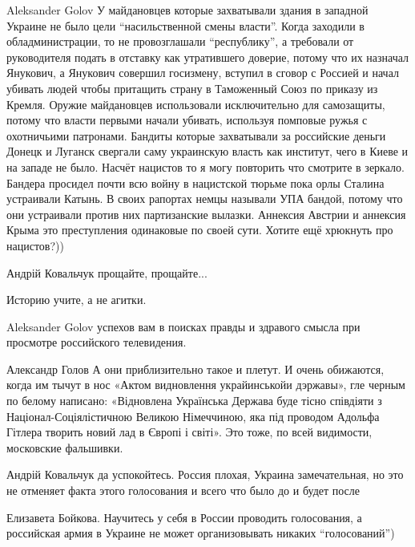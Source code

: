 \begin{itemize}

Aleksander Golov У майдановцев которые захватывали здания в западной Украине не
было цели \enquote{насильственной смены власти}. Когда заходили в обладминистрации, то
не провозглашали \enquote{республику}, а требовали от руководителя подать в отставку
как утратившего доверие, потому что их назначал Янукович, а Янукович совершил
госизмену, вступил в сговор с Россией и начал убивать людей чтобы притащить
страну в Таможенный Союз по приказу из Кремля. Оружие майдановцев использовали
исключительно для самозащиты, потому что власти первыми начали убивать,
используя помповые ружья с охотничьими патронами. Бандиты которые захватывали
за российские деньги Донецк и Луганск свергали саму украинскую власть как
институт, чего в Киеве и на западе не было. Насчёт нацистов то я могу повторить
что смотрите в зеркало. Бандера просидел почти всю войну в нацистской тюрьме
пока орлы Сталина устраивали Катынь. В своих рапортах немцы называли УПА
бандой, потому что они устраивали против них партизанские вылазки. Аннексия
Австрии и аннексия Крыма это преступления одинаковые по своей сути. Хотите ещё
хрюкнуть про нацистов?))


Андрій Ковальчук прощайте, прощайте...

Историю учите, а не агитки.


Aleksander Golov успехов вам в поисках правды и здравого смысла при просмотре
российского телевидения.


Александр Голов А они приблизительно такое и плетут. И очень обижаются, когда
им тычут в нос «Актом видновлення украйинськойи дэржавы», гле черным по белому
написано: «Відновлена Українська Держава буде тісно співдіяти з
Націонал-Соціялістичною Великою Німеччиною, яка під проводом Адольфа Гітлера
творить новий лад в Європі і світі». Это тоже, по всей видимости, московские
фальшивки.


Андрій Ковальчук да успокойтесь. Россия плохая, Украина замечательная, но это
не отменяет факта этого голосования и всего что было до и будет после


Елизавета Бойкова. Научитесь у себя в России проводить голосования, а
российская армия в Украине не может организовывать никаких \enquote{голосований})


\end{itemize}
